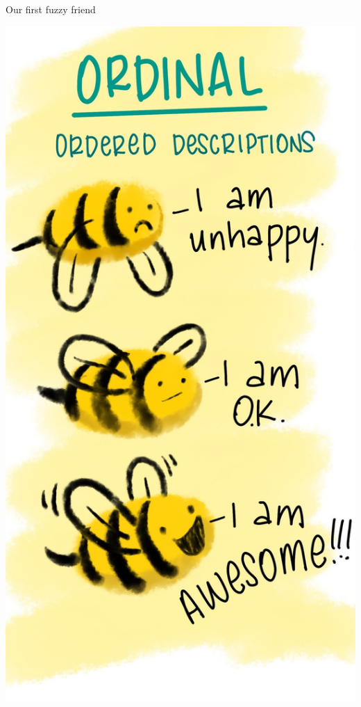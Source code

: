 \documentclass[
  ignorenonframetext,
]{beamer}
\begin{document}
\begin{frame}{Our first fuzzy friend}
\protect\hypertarget{our-first-fuzzy-friend}{}

\begin{center}
\includegraphics{../images/ord_copy.jpg}
\end{center}

\end{frame}
\end{document}

